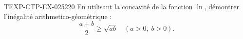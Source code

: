 \begin{exercice}{TEXP-CTP-EX-025}{2}{20}
En utilisant la concavité de la fonction $\ln$, démontrer l'inégalité arithmetico-géométrique :
\[ \frac{a+b}{2} \geq \sqrt{ab} \quad (a > 0,\; b > 0). \]

\end{exercice}
